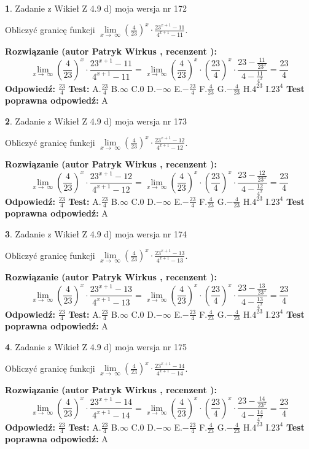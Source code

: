 \documentclass[12pt, a4paper]{article}
\theoremstyle{definition} %
\newtheorem{zad}{}
\newcommand{\zadStart}[1]{\begin{zad}#1\newline}
\newcommand{\zadStop}{\end{zad}}
\newcommand{\rozwStart}[2]{\noindent \textbf{Rozwiązanie (autor #1 , recenzent #2): }\newline}
\newcommand{\rozwStop}{\newline}
\newcommand{\odpStart}{\noindent \textbf{Odpowiedź:}\newline}
\newcommand{\odpStop}{\newline}
\newcommand{\testStart}{\noindent \textbf{Test:}\newline}
\newcommand{\testStop}{\newline}
\newcommand{\kluczStart}{\noindent \textbf{Test poprawna odpowiedź:}\newline}
\newcommand{\kluczStop}{\newline}
\begin{document}
\zadStart{Zadanie z Wikieł Z 4.9 d) moja wersja nr 172}


Obliczyć granicę funkcji  $\lim\limits_{x\to\ \infty}(\frac{4}{23})^{x}\cdot\frac{23^{x+1}-11}{4^{x+1}-11}$.
\zadStop
\rozwStart{Patryk Wirkus}{}
$$\lim\limits_{x\to\ \infty}(\frac{4}{23})^{x}\cdot\frac{23^{x+1}-11}{4^{x+1}-11}=\lim\limits_{x\to\ \infty}(\frac{4}{23})^{x}\cdot(\frac{23}{4})^{x} \cdot \frac{23-\frac{11}{23^{x}}}{4-\frac{11}{4^{x}}} = \frac{23}{4}$$
\rozwStop
\odpStart
$\frac{23}{4}$
\odpStop
\testStart
A.$\frac{23}{4}$ B.$\infty$ C.$0$ D.$-\infty$ E.$-\frac{23}{4}$
F.$\frac{4}{23}$ G.$-\frac{4}{23}$
H.$4^{23}$
I.$23^{4}$
\testStop
\kluczStart
A
\kluczStop



\zadStart{Zadanie z Wikieł Z 4.9 d) moja wersja nr 173}


Obliczyć granicę funkcji  $\lim\limits_{x\to\ \infty}(\frac{4}{23})^{x}\cdot\frac{23^{x+1}-12}{4^{x+1}-12}$.
\zadStop
\rozwStart{Patryk Wirkus}{}
$$\lim\limits_{x\to\ \infty}(\frac{4}{23})^{x}\cdot\frac{23^{x+1}-12}{4^{x+1}-12}=\lim\limits_{x\to\ \infty}(\frac{4}{23})^{x}\cdot(\frac{23}{4})^{x} \cdot \frac{23-\frac{12}{23^{x}}}{4-\frac{12}{4^{x}}} = \frac{23}{4}$$
\rozwStop
\odpStart
$\frac{23}{4}$
\odpStop
\testStart
A.$\frac{23}{4}$ B.$\infty$ C.$0$ D.$-\infty$ E.$-\frac{23}{4}$
F.$\frac{4}{23}$ G.$-\frac{4}{23}$
H.$4^{23}$
I.$23^{4}$
\testStop
\kluczStart
A
\kluczStop



\zadStart{Zadanie z Wikieł Z 4.9 d) moja wersja nr 174}


Obliczyć granicę funkcji  $\lim\limits_{x\to\ \infty}(\frac{4}{23})^{x}\cdot\frac{23^{x+1}-13}{4^{x+1}-13}$.
\zadStop
\rozwStart{Patryk Wirkus}{}
$$\lim\limits_{x\to\ \infty}(\frac{4}{23})^{x}\cdot\frac{23^{x+1}-13}{4^{x+1}-13}=\lim\limits_{x\to\ \infty}(\frac{4}{23})^{x}\cdot(\frac{23}{4})^{x} \cdot \frac{23-\frac{13}{23^{x}}}{4-\frac{13}{4^{x}}} = \frac{23}{4}$$
\rozwStop
\odpStart
$\frac{23}{4}$
\odpStop
\testStart
A.$\frac{23}{4}$ B.$\infty$ C.$0$ D.$-\infty$ E.$-\frac{23}{4}$
F.$\frac{4}{23}$ G.$-\frac{4}{23}$
H.$4^{23}$
I.$23^{4}$
\testStop
\kluczStart
A
\kluczStop



\zadStart{Zadanie z Wikieł Z 4.9 d) moja wersja nr 175}


Obliczyć granicę funkcji  $\lim\limits_{x\to\ \infty}(\frac{4}{23})^{x}\cdot\frac{23^{x+1}-14}{4^{x+1}-14}$.
\zadStop
\rozwStart{Patryk Wirkus}{}
$$\lim\limits_{x\to\ \infty}(\frac{4}{23})^{x}\cdot\frac{23^{x+1}-14}{4^{x+1}-14}=\lim\limits_{x\to\ \infty}(\frac{4}{23})^{x}\cdot(\frac{23}{4})^{x} \cdot \frac{23-\frac{14}{23^{x}}}{4-\frac{14}{4^{x}}} = \frac{23}{4}$$
\rozwStop
\odpStart
$\frac{23}{4}$
\odpStop
\testStart
A.$\frac{23}{4}$ B.$\infty$ C.$0$ D.$-\infty$ E.$-\frac{23}{4}$
F.$\frac{4}{23}$ G.$-\frac{4}{23}$
H.$4^{23}$
I.$23^{4}$
\testStop
\kluczStart
A
\kluczStop
\end{document}
